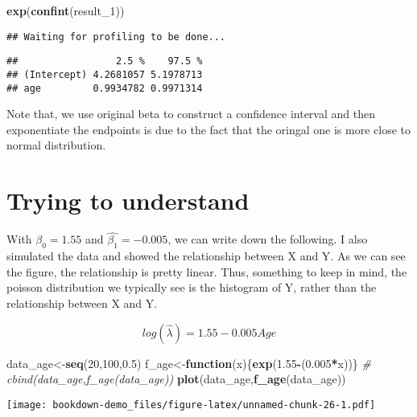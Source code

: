 \documentclass[]{book}
\newenvironment{Shaded}{\begin{snugshade}}{\end{snugshade}}
\newcommand{\CommentTok}[1]{\textcolor[rgb]{0.56,0.35,0.01}{\textit{#1}}}
\newcommand{\ControlFlowTok}[1]{\textcolor[rgb]{0.13,0.29,0.53}{\textbf{#1}}}
\newcommand{\DecValTok}[1]{\textcolor[rgb]{0.00,0.00,0.81}{#1}}
\newcommand{\FloatTok}[1]{\textcolor[rgb]{0.00,0.00,0.81}{#1}}
\newcommand{\KeywordTok}[1]{\textcolor[rgb]{0.13,0.29,0.53}{\textbf{#1}}}
\newcommand{\NormalTok}[1]{#1}
\newcommand{\OperatorTok}[1]{\textcolor[rgb]{0.81,0.36,0.00}{\textbf{#1}}}
\begin{document}
\begin{Shaded}
\begin{Highlighting}[]
\KeywordTok{exp}\NormalTok{(}\KeywordTok{confint}\NormalTok{(result_}\DecValTok{1}\NormalTok{))}
\end{Highlighting}
\end{Shaded}

\begin{verbatim}
## Waiting for profiling to be done...
\end{verbatim}

\begin{verbatim}
##                 2.5 %    97.5 %
## (Intercept) 4.2681057 5.1978713
## age         0.9934782 0.9971314
\end{verbatim}

Note that, we use original beta to construct a confidence interval and then exponentiate the endpoints is due to the fact that the oringal one is more close to normal distribution.

\hypertarget{trying-to-understand}{%
\section{Trying to understand}\label{trying-to-understand}}

With \(\hat{\beta_0} = 1.55\) and \(\hat{\beta_1}=-0.005\), we can write down the following. I also simulated the data and showed the relationship between X and Y. As we can see the figure, the relationship is pretty linear. Thus, something to keep in mind, the poisson distribution we typically see is the histogram of Y, rather than the relationship between X and Y.

\[log(\hat{\lambda})=1.55-0.005 Age\]

\begin{Shaded}
\begin{Highlighting}[]
\NormalTok{data_age<-}\KeywordTok{seq}\NormalTok{(}\DecValTok{20}\NormalTok{,}\DecValTok{100}\NormalTok{,}\FloatTok{0.5}\NormalTok{)}
\NormalTok{f_age<-}\ControlFlowTok{function}\NormalTok{(x)\{}\KeywordTok{exp}\NormalTok{(}\FloatTok{1.55}\OperatorTok{-}\NormalTok{(}\FloatTok{0.005}\OperatorTok{*}\NormalTok{x))\}}
\CommentTok{# cbind(data_age,f_age(data_age))}
\KeywordTok{plot}\NormalTok{(data_age,}\KeywordTok{f_age}\NormalTok{(data_age))}
\end{Highlighting}
\end{Shaded}

\texttt{[image: bookdown-demo\_files/figure-latex/unnamed-chunk-26-1.pdf]}
\end{document}
